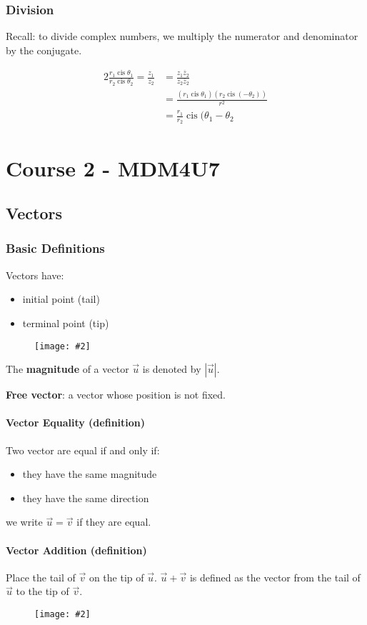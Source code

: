 \documentclass[letterpaper, 12pt]{report}
\newcommand{\diagram}[2][0.5]{
	\begin{figure}[H]
		\centering
		\texttt{[image: \#2]}
	\end{figure}
	}
\DeclareMathOperator\cis{cis}
\theoremstyle{definition}
\numberwithin{equation}{section}
\begin{document}
\subsection{Division}
Recall: to divide complex numbers, we multiply the numerator and denominator by the conjugate.

\begin{alignat*}{2}{}
	\frac{r_1 \cis \theta_1}{r_2 \cis \theta_2} = \frac{z_1}{z_2} &= \frac{z_1 \overline{z}_2}{z_2\overline{z}_2} \\
	&= \frac{(r_1\cis\theta_1)(r_2\cis(-\theta_2))}{r^2} \\
	&= \frac{r_1}{r_2}\cis(\theta_1-\theta_2
\end{alignat*}

\chapter{Course 2 - MDM4U7}

\section{Vectors}
\subsection{Basic Definitions}
Vectors have:
\begin{itemize}
	\item initial point (tail)
	\item terminal point (tip)
\end{itemize}
\diagram[0.6]{vector}
The \textbf{magnitude} of a vector $\vec u$ is denoted by $| \vec u |$.

\bigskip \noindent
\textbf{Free vector}: a vector whose position is not fixed.

\subsubsection{Vector Equality (definition)}
Two vector are equal if and only if:
\begin{itemize}
	\item they have the same magnitude
	\item they have the same direction	
\end{itemize}
we write $\vec u = \vec v$ if they are equal.

\subsubsection{Vector Addition (definition)}
Place the tail of $\vec v$ on the tip of $\vec u$. $\vec u + \vec v$ is defined as the vector from the tail of $\vec u$ to the tip of $\vec v$.
\diagram{vector-add}
\end{document}
